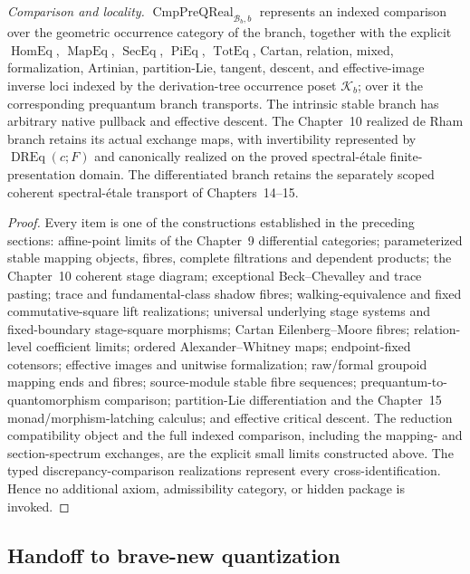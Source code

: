 \begin{theorem}
\medskip
\noindent\emph{Comparison and locality.}
$\operatorname{CmpPreQReal}_{\mathcal B_b,b}$ represents an indexed comparison
over the geometric occurrence category of the branch, together with the
explicit $\operatorname{HomEq}$, $\operatorname{MapEq}$,
$\operatorname{SecEq}$, $\operatorname{PiEq}$, $\operatorname{TotEq}$,
Cartan, relation, mixed,
formalization, Artinian, partition-Lie, tangent, descent, and effective-image
inverse loci indexed by the derivation-tree occurrence poset $\mathcal K_b$; over it the corresponding
prequantum branch transports.  The intrinsic stable branch
has arbitrary native pullback and effective descent.  The Chapter~10 realized de
Rham branch retains its actual exchange maps, with invertibility represented by
$\operatorname{DREq}(c;F)$ and canonically realized on the proved
spectral-\'etale finite-presentation domain.  The differentiated branch retains
the separately scoped coherent spectral-\'etale transport of Chapters~14--15.
\end{theorem}

\begin{proof}
Every item is one of the constructions established in the preceding sections:
affine-point limits of the Chapter~9 differential categories; parameterized stable
mapping objects, fibres, complete filtrations and dependent products; the
Chapter~10 coherent stage diagram; exceptional Beck--Chevalley and trace pasting;
trace and fundamental-class shadow fibres; walking-equivalence and fixed
commutative-square lift realizations; universal underlying stage systems and
fixed-boundary stage-square morphisms; Cartan Eilenberg--Moore
fibres; relation-level coefficient limits; ordered Alexander--Whitney maps;
endpoint-fixed cotensors; effective images and unitwise formalization; raw/formal
groupoid mapping ends and fibres; source-module stable fibre sequences;
prequantum-to-quantomorphism comparison; partition-Lie
differentiation and the Chapter~15 monad/morphism-latching calculus; and effective
critical descent.  The reduction compatibility object and the full indexed
comparison, including the mapping- and section-spectrum exchanges, are the
explicit small limits constructed above.  The typed
discrepancy-comparison realizations represent every cross-identification.  Hence
no additional axiom, admissibility category, or hidden package is invoked.
\end{proof}

\subsection{Handoff to brave-new quantization}
\label{subsec:prequantum-handoff-quantization}

